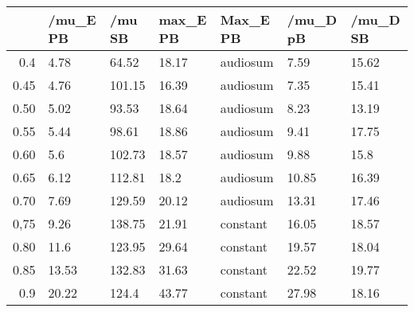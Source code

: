 \begin{table}[ht]
\centering
\begin{tabular}{rllllll}
  \hline
 & /mu\_E PB & /mu SB & max\_E PB & Max\_E PB & /mu\_D pB & /mu\_D SB \\ 
  \hline
0.4 & 4.78 & 64.52 & 18.17 & audiosum & 7.59 & 15.62 \\ 
  0.45 & 4.76 & 101.15 & 16.39 & audiosum & 7.35 & 15.41 \\ 
  0.50 & 5.02 & 93.53 & 18.64 & audiosum & 8.23 & 13.19 \\ 
  0.55 & 5.44 & 98.61 & 18.86 & audiosum & 9.41 & 17.75 \\ 
  0.60 & 5.6 & 102.73 & 18.57 & audiosum & 9.88 & 15.8 \\ 
  0.65 & 6.12 & 112.81 & 18.2 & audiosum & 10.85 & 16.39 \\ 
  0.70 & 7.69 & 129.59 & 20.12 & audiosum & 13.31 & 17.46 \\ 
  0,75 & 9.26 & 138.75 & 21.91 & constant & 16.05 & 18.57 \\ 
  0.80 & 11.6 & 123.95 & 29.64 & constant & 19.57 & 18.04 \\ 
  0.85 & 13.53 & 132.83 & 31.63 & constant & 22.52 & 19.77 \\ 
  0.9 & 20.22 & 124.4 & 43.77 & constant & 27.98 & 18.16 \\ 
   \hline
\end{tabular}
\end{table}
